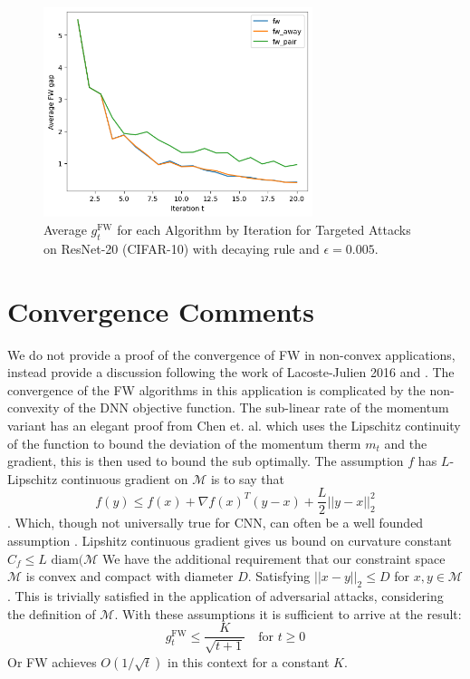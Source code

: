\documentclass{article}
\begin{document}
\begin{figure}[H]
    \centering
    \includegraphics[width=0.7\textwidth]{plots/mdl_compare_avg_FWgap_by_iter.png}
    \caption{Average $g^\text{FW}_t$ for each Algorithm by Iteration for Targeted Attacks on ResNet-20 (CIFAR-10) with decaying rule and $\epsilon = 0.005$.}
    \label{fig:converge-compare}
\end{figure}

\section{Convergence Comments}
We do not provide a proof of the convergence of FW in non-convex applications, instead provide a discussion
 following the work of Lacoste-Julien 2016 \cite{fw-noncovex} and \cite{attacks}. 
The convergence of the FW algorithms in this application is complicated by the non-convexity of the DNN objective function. The sub-linear rate of the momentum variant has an elegant proof from Chen et. al. \cite{attacks} which uses the Lipschitz continuity of the function to bound the deviation of the momentum therm $m_t$ and the gradient, this is then used to bound the sub optimally. 
The assumption $f$ has $L$-Lipschitz continuous gradient on $\mathcal{M}$ is to say that 
$$ f(y) \leq f(x) + \nabla f(x)^T (y-x) + \frac{L}{2}||y-x||_2^2$$. Which, though not universally true for CNN, can often be a well founded assumption \cite{attacks}. 
Lipshitz continuous gradient gives us bound on curvature constant $C_f \leq L \text{ diam}(\mathcal{M}$ %
We have the additional requirement that our constraint space $\mathcal{M}$ is convex and compact with diameter $D$. Satisfying $||x-y||_2 \leq D$ for $x,y \in \mathcal{M}$. This is trivially satisfied in the application of adversarial attacks, considering the definition of $\mathcal{M}$. With these assumptions it is sufficient to arrive at the result:
$$g_t^\text{FW} \leq \frac{K}{\sqrt{t+1}} \quad \text{for }t\geq 0$$
Or FW achieves $O(1/\sqrt{t})$ in this context for a constant $K$. 
\end{document}
